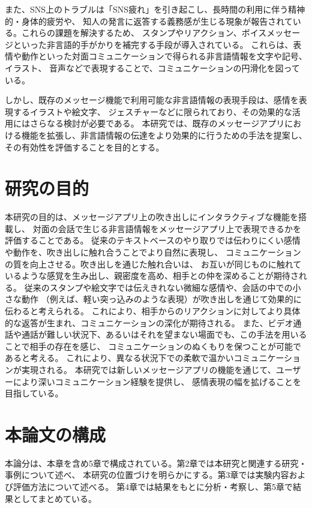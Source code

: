 \documentclass[11pt,a4paper]{ltjsreport}
\begin{document}
また、SNS上のトラブルは「SNS疲れ」を引き起こし、長時間の利用に伴う精神的・身体的疲労や、
知人の発言に返答する義務感が生じる現象が報告されている\cite{Thesis_Okamoto}。これらの課題を解決するため、
スタンプやリアクション、ボイスメッセージといった非言語的手がかりを補完する手段が導入されている。
これらは、表情や動作といった対面コミュニケーションで得られる非言語情報を文字や記号、イラスト、
音声などで表現することで、コミュニケーションの円滑化を図っている。

しかし、既存のメッセージ機能で利用可能な非言語情報の表現手段は、感情を表現するイラストや絵文字、
ジェスチャーなどに限られており、その効果的な活用にはさらなる検討が必要である。
本研究では、既存のメッセージアプリにおける機能を拡張し、非言語情報の伝達をより効果的に行うための手法を提案し、
その有効性を評価することを目的とする。

\section{研究の目的}
本研究の目的は、メッセージアプリ上の吹き出しにインタラクティブな機能を搭載し、
対面の会話で生じる非言語情報をメッセージアプリ上で表現できるかを評価することである。
従来のテキストベースのやり取りでは伝わりにくい感情や動作を、吹き出しに触れ合うことでより自然に表現し、
コミュニケーションの質を向上させる。吹き出しを通じた触れ合いは、
お互いが同じものに触れているような感覚を生み出し、親密度を高め、相手との仲を深めることが期待される。
従来のスタンプや絵文字では伝えきれない微細な感情や、会話の中での小さな動作
（例えば、軽い突っ込みのような表現）が吹き出しを通じて効果的に伝わると考えられる。
これにより、相手からのリアクションに対してより具体的な返答が生まれ、コミュニケーションの深化が期待される。
また、ビデオ通話や通話が難しい状況下、あるいはそれを望まない場面でも、この手法を用いることで相手の存在を感じ、
コミュニケーションのぬくもりを保つことが可能であると考える。
これにより、異なる状況下での柔軟で温かいコミュニケーションが実現される。
本研究では新しいメッセージアプリの機能を通じて、ユーザーにより深いコミュニケーション経験を提供し、
感情表現の幅を拡げることを目指している。

\section{本論文の構成}
本論分は、本章を含め5章で構成されている。第2章では本研究と関連する研究・事例について述べ、
本研究の位置づけを明らかにする。第3章では実験内容および評価方法について述べる。
第4章では結果をもとに分析・考察し、第5章で結果としてまとめている。
\end{document}
